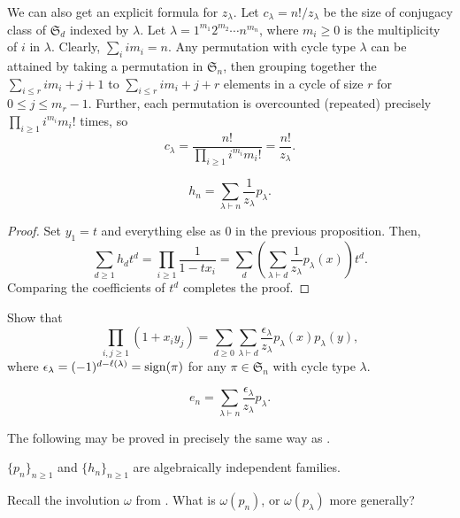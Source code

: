 	We can also get an explicit formula for $z_\lambda$. Let $c_\lambda = n!/z_\lambda$ be the size of conjugacy class of $\mathfrak{S}_d$ indexed by $\lambda$. Let $\lambda = 1^{m_1} 2^{m_2} \cdots n^{m_n}$, where $m_i \ge 0$ is the multiplicity of $i$ in $\lambda$. Clearly, $\sum_i i m_i = n$. Any permutation with cycle type $\lambda$ can be attained by taking a permutation in $\mathfrak{S}_n$, then grouping together the $\sum_{i \le r} i m_i + j + 1$ to $\sum_{i \le r} i m_i + j + r$ elements in a cycle of size $r$ for $0 \le j \le m_r-1$. Further, each permutation is overcounted (repeated) precisely $\prod_{i \ge 1} i^{m_i} m_i!$ times, so
	\[ c_\lambda = \frac{n!}{\prod_{i \ge 1} i^{m_i} m_i!} = \frac{n!}{z_\lambda}. \]

	\begin{corollary}
		\[ h_n = \sum_{\lambda \vdash n} \frac{1}{z_\lambda} p_\lambda. \]
	\end{corollary}
	\begin{proof}
		Set $y_1 = t$ and everything else as $0$ in the previous proposition. Then,
		\[ \sum_{d \ge 1} h_d t^d = \prod_{i \ge 1} \frac{1}{1-tx_i} = \sum_d \left(\sum_{\lambda \vdash d} \frac{1}{z_\lambda} p_\lambda(x)\right) t^d. \]
		Comparing the coefficients of $t^d$ completes the proof.
	\end{proof}

	\begin{exercise}
		Show that
		\[ \prod_{i,j \ge 1} (1+x_iy_j) = \sum_{d \ge 0} \sum_{\lambda \vdash d} \frac{\epsilon_\lambda}{z_\lambda} p_\lambda(x) p_\lambda(y), \]
		where $\epsilon_\lambda = (-1)^{d - \ell(\lambda)} = \operatorname{sign}(\pi)$ for any $\pi \in \mathfrak{S}_n$ with cycle type $\lambda$.
	\end{exercise}

	\begin{corollary}
		\[ e_n = \sum_{\lambda \vdash n} \frac{\epsilon_\lambda}{z_\lambda} p_\lambda. \]
	\end{corollary}

	The following may be proved in precisely the same way as .
	\begin{fpor}
		$\{p_n\}_{n \ge 1}$ and $\{h_n\}_{n \ge 1}$ are algebraically independent families.
	\end{fpor}

	Recall the involution $\omega$ from . What is $\omega(p_n)$, or $\omega(p_\lambda)$ more generally?

